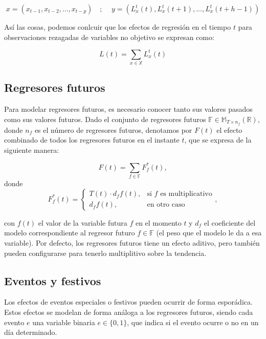 \documentclass[12pt,twoside]{article}
\begin{document}
\begin{equation}
x = (x_{t-1},x_{t-2},...,x_{t-p}) \quad \text{; }\quad y=(L_x^t(t),L_x^t(t+1),...,L_x^t(t+h-1))
\end{equation}

Así las cosas, podemos conlcuir que los efectos de regresión en el tiempo $t$ para observaciones rezagadas de variables no objetivo se expresan como:

\begin{equation}
L(t) = \sum_{x \in \mathbb{X}}L_x^t(t)
\end{equation}

\subsection{Regresores futuros}\label{sec:29}

Para modelar regresores futuros, es necesario conocer tanto sus valores pasados como sus valores futuros. Dado el conjunto de regresores futuros $\mathbb{F}\in \mathbb{M}_{T \times n_f}(\mathbb{R})$, donde $n_f$ es el número de regresores futuros, denotamos por $F(t)$ el efecto combinado de todos los regresores futuros en el instante $t$, que se expresa de la siguiente manera:

\begin{equation}
F(t) = \sum_{f\in\mathbb{F}} F^*_f(t), 
\end{equation}
 donde 
\begin{equation}
F_f^*(t) =
\begin{cases}
T(t) \cdot d_ff(t), & \text{si } f \text{ es multiplicativo} \\
d_ff(t), & \text{en otro caso}
\end{cases},
\end{equation}

con $f(t)$ el valor de la variable futura $f$ en el momento $t$ y $d_f$ el coeficiente del modelo correspondiente al regresor futuro $f\in \mathbb{F}$ (el peso que el modelo le da a esa variable). Por defecto, los regresores futuros tiene un efecto aditivo, pero también pueden configurarse para tenerlo multiplitivo sobre la tendencia.


\subsection{Eventos y festivos}\label{sec:30}

Los efectos de eventos especiales o festivos pueden ocurrir de forma esporádica. Estos efectos se modelan de forma análoga a los regresores futuros, siendo cada evento $e$ una variable binaria $e\in\{0,1\}$, que indica si el evento ocurre o no en un día determinado.
\end{document}
